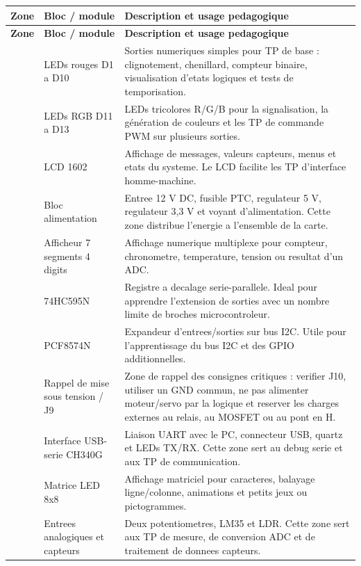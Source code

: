 \documentclass[11pt,a4paper]{article}
\begin{document}
\begin{center}
{\small
\begin{longtable}{@{}>{\centering\arraybackslash}p{0.9cm}>{\RaggedRight\arraybackslash}p{4.0cm}>{\RaggedRight\arraybackslash}p{11.0cm}@{}}
\toprule
\rowcolor{bleuPCB!12}
\textbf{Zone} & \textbf{Bloc / module} & \textbf{Description et usage pedagogique} \\
\midrule
\endfirsthead
\toprule
\rowcolor{bleuPCB!12}
\textbf{Zone} & \textbf{Bloc / module} & \textbf{Description et usage pedagogique} \\
\midrule
\endhead
1 & LEDs rouges D1 a D10 & Sorties numeriques simples pour TP de base : clignotement, chenillard, compteur binaire, visualisation d'etats logiques et tests de temporisation. \\
2 & LEDs RGB D11 a D13 & LEDs tricolores R/G/B pour la signalisation, la génération de couleurs et les TP de commande PWM sur plusieurs sorties. \\
3 & LCD 1602 & Affichage de messages, valeurs capteurs, menus et etats du systeme. Le LCD facilite les TP d'interface homme-machine. \\
4 & Bloc alimentation & Entree 12 V DC, fusible PTC, regulateur 5 V, regulateur 3,3 V et voyant d'alimentation. Cette zone distribue l'energie a l'ensemble de la carte. \\
5 & Afficheur 7 segments 4 digits & Affichage numerique multiplexe pour compteur, chronometre, temperature, tension ou resultat d'un ADC. \\
6 & 74HC595N & Registre a decalage serie-parallele. Ideal pour apprendre l'extension de sorties avec un nombre limite de broches microcontroleur. \\
7 & PCF8574N & Expandeur d'entrees/sorties sur bus I2C. Utile pour l'apprentissage du bus I2C et des GPIO additionnelles. \\
8 & Rappel de mise sous tension / J9 & Zone de rappel des consignes critiques : verifier J10, utiliser un GND commun, ne pas alimenter moteur/servo par la logique et reserver les charges externes au relais, au MOSFET ou au pont en H. \\
9 & Interface USB-serie CH340G & Liaison UART avec le PC, connecteur USB, quartz et LEDs TX/RX. Cette zone sert au debug serie et aux TP de communication. \\
10 & Matrice LED 8x8 & Affichage matriciel pour caracteres, balayage ligne/colonne, animations et petits jeux ou pictogrammes. \\
11 & Entrees analogiques et capteurs & Deux potentiometres, LM35 et LDR. Cette zone sert aux TP de mesure, de conversion ADC et de traitement de donnees capteurs. \\

\end{longtable}}
\end{center}
\end{document}
